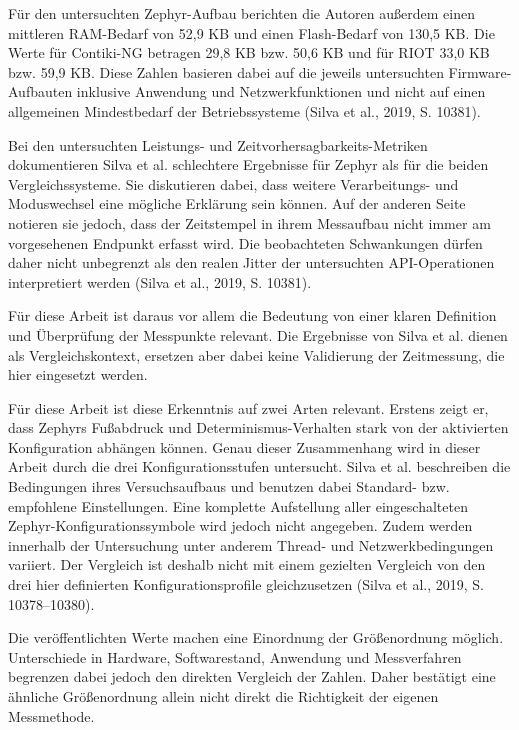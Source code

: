 F{\"u}r den untersuchten Zephyr-Aufbau berichten die Autoren au{\ss}erdem einen mittleren RAM-Bedarf von 52,9 KB und einen Flash-Bedarf von 130,5 KB. Die Werte f{\"u}r Contiki-NG betragen 29,8 KB bzw. 50,6 KB und f{\"u}r RIOT 33,0 KB bzw. 59,9 KB. Diese Zahlen basieren dabei auf die jeweils untersuchten Firmware-Aufbauten inklusive Anwendung und Netzwerkfunktionen und nicht auf einen allgemeinen Mindestbedarf der Betriebssysteme (Silva et al., 2019, S. 10381).

Bei den untersuchten Leistungs- und Zeitvorhersagbarkeits-Metriken dokumentieren Silva et al. schlechtere Ergebnisse f{\"u}r Zephyr als f{\"u}r die beiden Vergleichssysteme. Sie diskutieren dabei, dass weitere Verarbeitungs- und Moduswechsel eine m{\"o}gliche Erkl{\"a}rung sein k{\"o}nnen. Auf der anderen Seite notieren sie jedoch, dass der Zeitstempel in ihrem Messaufbau nicht immer am vorgesehenen Endpunkt erfasst wird. Die beobachteten Schwankungen d{\"u}rfen daher nicht unbegrenzt als den realen Jitter der untersuchten API-Operationen interpretiert werden (Silva et al., 2019, S. 10381).

F{\"u}r diese Arbeit ist daraus vor allem die Bedeutung von einer klaren Definition und {\"U}berpr{\"u}fung der Messpunkte relevant. Die Ergebnisse von Silva et al. dienen als Vergleichskontext, ersetzen aber dabei keine Validierung der Zeitmessung, die hier eingesetzt werden.

F{\"u}r diese Arbeit ist diese Erkenntnis auf zwei Arten relevant. Erstens zeigt er, dass Zephyrs Fu{\ss}abdruck und Determinismus-Verhalten stark von der aktivierten Konfiguration abh{\"a}ngen k{\"o}nnen. Genau dieser Zusammenhang wird in dieser Arbeit durch die drei Konfigurationsstufen untersucht. Silva et al. beschreiben die Bedingungen ihres Versuchsaufbaus und benutzen dabei Standard- bzw. empfohlene Einstellungen. Eine komplette Aufstellung aller eingeschalteten Zephyr-Konfigurationssymbole wird jedoch nicht angegeben. Zudem werden innerhalb der Untersuchung unter anderem Thread- und Netzwerkbedingungen variiert. Der Vergleich ist deshalb nicht mit einem gezielten Vergleich von den drei hier definierten Konfigurationsprofile gleichzusetzen (Silva et al., 2019, S. 10378--10380).

Die ver{\"o}ffentlichten Werte machen eine Einordnung der Gr{\"o}{\ss}enordnung m{\"o}glich. Unterschiede in Hardware, Softwarestand, Anwendung und Messverfahren begrenzen dabei jedoch den direkten Vergleich der Zahlen. Daher best{\"a}tigt eine {\"a}hnliche Gr{\"o}{\ss}enordnung allein nicht direkt die Richtigkeit der eigenen Messmethode.

